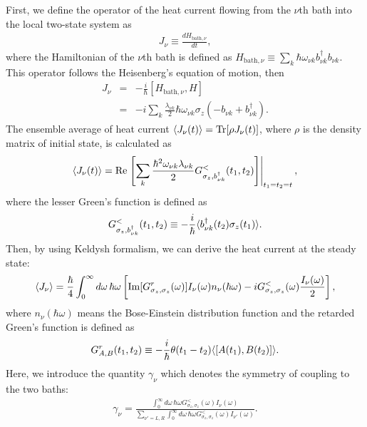 First, we define the operator of the heat current flowing from the $\nu$th bath into the local two-state system as 
\begin{eqnarray}
	J_\nu\equiv\frac{dH_{\mathrm{bath},\nu}}{dt},
	\label{current_opperator}
\end{eqnarray}
where the Hamiltonian of the $\nu$th bath is defined as $H_{\mathrm{bath},\nu} \equiv\sum_k\hbar \omega_{\nu k } b_{\nu k}^{\dagger} b_{\nu k}$.
This operator follows the Heisenberg's equation of motion, then 
\begin{eqnarray}
	J_\nu&=&-\frac{i}{\hbar}[H_{\mathrm{bath},\nu},H]\\
	&=&-i \sum_k\frac{\lambda_{\nu k}}{2}\hbar\omega_{\nu k}\sigma_z(-b_{\nu k}+b_{\nu k}^{\dagger}).
\end{eqnarray}
The ensemble average of heat current $\langle J_\nu(t)\rangle=\mathrm{Tr}[\rho J_\nu(t)]$, where $\rho$ is the density matrix of initial state, is calculated as 
\begin{eqnarray}
	\langle J_\nu(t)\rangle=\mathrm{Re}\left . \left[\sum_k\frac{\hbar^2\omega_{\nu k} \lambda_{\nu k}}{2}
	G^{<}_{\sigma_z,b_{\nu k}^{\dagger}}(t_1,t_2)\right] \right |_{t_1=t_2=t},
\end{eqnarray}
where the lesser Green's function is defined as 
\begin{eqnarray}
	G^{<}_{\sigma_z,b_{\nu k}^{\dagger}}(t_1,t_2)\equiv-\frac{i}{\hbar}\langle b_{\nu k}^{\dagger}(t_2)\sigma_z(t_1)\rangle.
\end{eqnarray}
Then, by using Keldysh formalism, we can derive the heat current at the steady state\cite{Saito08}:
\begin{eqnarray}
	\langle J_\nu\rangle=\frac{\hbar}{4}\int_{0}^{\infty}d\omega\, 
		\hbar \omega\left[ 
			\mathrm{Im}[G_{\sigma_z,\sigma_z}^{r}(\omega)]I_\nu(\omega)n_\nu( \hbar\omega)-
			iG^{<}_{\sigma_z,\sigma_z}(\omega)\frac{I_\nu(\omega)}{2}
		\right],
\end{eqnarray}
where  $n_\nu( \hbar\omega)$ means the Bose-Einstein distribution function and the retarded Green's function is defined as 
\begin{eqnarray}
	G_{A,B}^r(t_1,t_2)\equiv -\frac{i}{\hbar}\theta(t_1-t_2)\langle[A(t_1),B(t_2)]\rangle.
\end{eqnarray}
Here, we introduce the quantity $\gamma_\nu$ which denotes the symmetry of coupling to the two baths:
\begin{eqnarray}
	\gamma_\nu=\frac{\int_0^{\infty}d\omega\,\hbar\omega G_{\sigma_z,\sigma_z}^{<}(\omega)I_\nu(\omega)}	{\sum_{\nu'=L,R}\int_{0}^{\infty}d\omega\,\hbar\omega G_{\sigma_z,\sigma_z}^<(\omega)I_{\nu'}(\omega)}.
\end{eqnarray}
